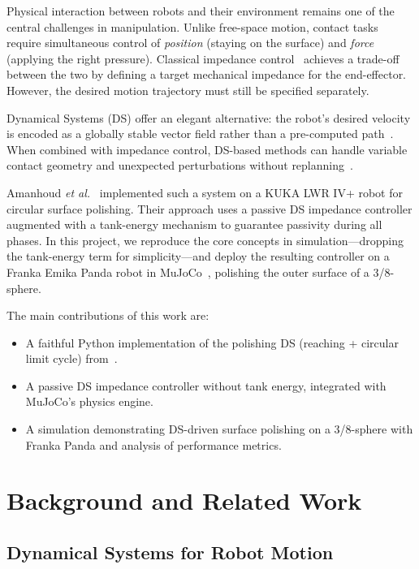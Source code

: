 \documentclass[conference]{IEEEtran}
\begin{document}
Physical interaction between robots and their environment remains one of the
central challenges in manipulation. Unlike free-space motion, contact tasks
require simultaneous control of \emph{position} (staying on the surface) and
\emph{force} (applying the right pressure). Classical impedance
control~\cite{hogan1985} achieves a trade-off between the two by defining a
target mechanical impedance for the end-effector. However, the desired motion
trajectory must still be specified separately.

Dynamical Systems (DS) offer an elegant alternative: the robot's desired
velocity is encoded as a globally stable vector field rather than a
pre-computed path~\cite{khansari2014}. When combined with impedance control,
DS-based methods can handle variable contact geometry and
unexpected perturbations without replanning~\cite{amanhoud2019}.

Amanhoud \emph{et al.}~\cite{amanhoud2019} implemented such a system on a
KUKA LWR IV+ robot for circular surface polishing. Their approach uses a
passive DS impedance controller augmented with a tank-energy mechanism to
guarantee passivity during all phases. In this project, we reproduce the
core concepts in simulation—dropping the tank-energy term for simplicity—and
deploy the resulting controller on a Franka Emika Panda robot in
MuJoCo~\cite{todorov2012}, polishing the outer surface of a 3/8-sphere.

The main contributions of this work are:
\begin{itemize}
  \item A faithful Python implementation of the polishing DS (reaching +
        circular limit cycle) from~\cite{amanhoud2019}.
  \item A passive DS impedance controller without tank energy, integrated
        with MuJoCo's physics engine.
  \item A simulation demonstrating DS-driven surface polishing on a 3/8-sphere
        with Franka Panda and analysis of performance metrics.
\end{itemize}

\section{Background and Related Work}
\label{sec:background}

\subsection{Dynamical Systems for Robot Motion}
\end{document}
